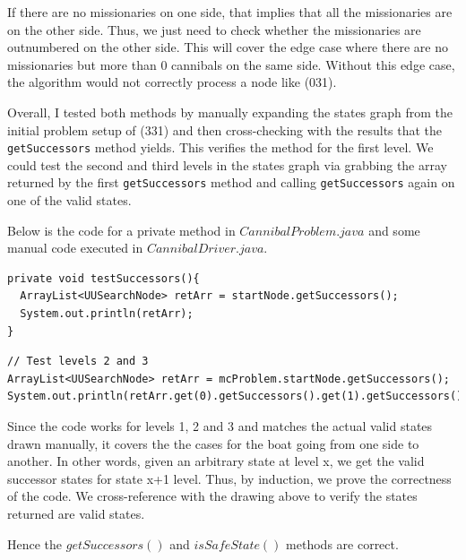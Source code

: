 \documentclass[a4paper]{report}
\begin{document}
If there are no missionaries on one side, that implies that all the missionaries are on the 
other side. Thus, we just need to check whether the missionaries are outnumbered on the other side. 
This will cover the edge case where there are no missionaries but more than 0 cannibals on the same side. 
Without this edge case, the algorithm would not correctly process a node like (031).

Overall, I tested both methods by manually expanding the states graph from the initial problem setup of
(331) and then cross-checking with the results that the \verb`getSuccessors` method yields. This verifies
the method for the first level. We could test the second and third levels in the states graph via grabbing
the array returned by the first \verb`getSuccessors` method and calling \verb`getSuccessors` again on 
one of the valid states.

Below is the code for a private method in $CannibalProblem.java$ and some manual code executed in 
$CannibalDriver.java$. 

\begin{lstlisting}
private void testSuccessors(){
  ArrayList<UUSearchNode> retArr = startNode.getSuccessors();
  System.out.println(retArr);
}
\end{lstlisting}

\begin{lstlisting}
// Test levels 2 and 3
ArrayList<UUSearchNode> retArr = mcProblem.startNode.getSuccessors();
System.out.println(retArr.get(0).getSuccessors().get(1).getSuccessors());
\end{lstlisting}

Since the code works for levels 1, 2 and 3 and matches the actual valid states drawn manually, 
it covers the the cases for the boat going from one side to another. In other words, given an arbitrary
state at level x, we get the valid successor states for state x+1 level. Thus, by induction, we prove
the correctness of the code. We cross-reference with the drawing above to verify the states returned
are valid states. 

Hence the $getSuccessors()$ and $isSafeState()$ methods are correct. 
\end{document}
